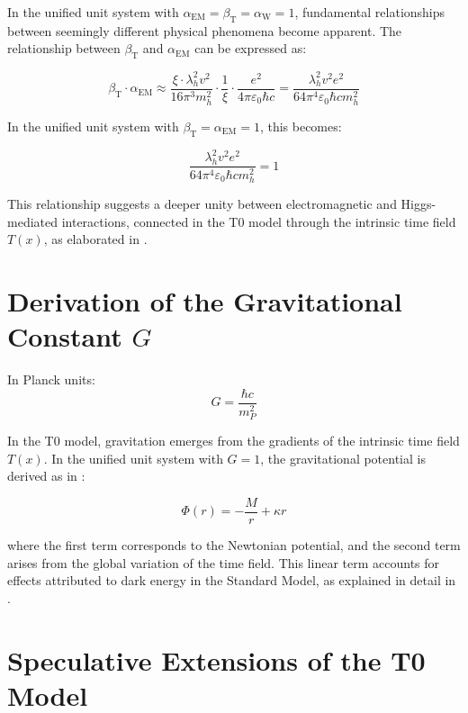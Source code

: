 \documentclass[12pt,a4paper]{article}
\newcommand{\Tfield}{T(x)}
\newcommand{\betaT}{\beta_{\text{T}}}
\newcommand{\alphaEM}{\alpha_{\text{EM}}}
\newcommand{\alphaW}{\alpha_{\text{W}}}
\begin{document}
	In the unified unit system with \(\alphaEM = \betaT = \alphaW = 1\), fundamental relationships between seemingly different physical phenomena become apparent. The relationship between \(\betaT\) and \(\alphaEM\) can be expressed as:
	
	\begin{equation}
		\betaT \cdot \alphaEM \approx \frac{\xi \cdot \lambda_h^2 v^2}{16\pi^3 m_h^2} \cdot \frac{1}{\xi} \cdot \frac{e^2}{4\pi\varepsilon_0\hbar c} = \frac{\lambda_h^2 v^2 e^2}{64\pi^4\varepsilon_0\hbar c m_h^2}
	\end{equation}
	
	In the unified unit system with \(\betaT = \alphaEM = 1\), this becomes:
	
	\begin{equation}
		\frac{\lambda_h^2 v^2 e^2}{64\pi^4\varepsilon_0\hbar c m_h^2} = 1
	\end{equation}
	
	This relationship suggests a deeper unity between electromagnetic and Higgs-mediated interactions, connected in the T0 model through the intrinsic time field \(\Tfield\), as elaborated in \cite{pascher_higgs_2025}.
	
	\section{Derivation of the Gravitational Constant \(G\)}
	\label{sec:gravitational_constant}
	
	In Planck units:
	\begin{equation}
		G = \frac{\hbar c}{m_P^2}
	\end{equation}
	
	In the T0 model, gravitation emerges from the gradients of the intrinsic time field \(\Tfield\). In the unified unit system with \(G = 1\), the gravitational potential is derived as in \cite{pascher_emergente_gravitation_2025}:
	
	\begin{equation}
		\label{eq:grav_potential}
		\Phi(r) = -\frac{M}{r} + \kappa r
	\end{equation}
	
	where the first term corresponds to the Newtonian potential, and the second term arises from the global variation of the time field. This linear term accounts for effects attributed to dark energy in the Standard Model, as explained in detail in \cite{pascher_galaxies_2025}.
	
	\section{Speculative Extensions of the T0 Model}
	\label{sec:speculative}
	
\end{document}
